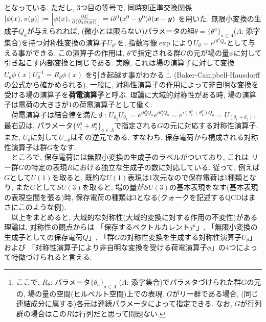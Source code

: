 \documentclass{ltjsarticle}
\theoremstyle{mystyle} %
\numberwithin{equation}{section}
\begin{document}
となっている. ただし, 3つ目の等号で, 同時刻正準交換関係$\left[{\phi(x), \pi(y)}\right]:=\left[{\phi(x), \frac{\partial\mathcal{L}}{\partial(\partial_0 \phi(y))}}\right]=i\delta^{0}(x^0-y^0)\delta(\bm{x}-\bm{y})$
を用いた. 
無限小変換の生成子$Q_a$が与えられれば, (微小とは限らない)パラメータの組$\theta=\{\theta^a\}_{a\in \Lambda}$($\Lambda$: 添字集合)を持つ対称性変換の演算子$U_{\theta^a}$を, 
指数写像$\exp$により$U_{\theta}=e^{i\theta^a Q_a}$として与える事ができる. 
この演算子の作用は, $\theta$で指定される群$G$の元が場の量$\phi$に対して引き起こす内部変換と同じである. 
実際, これは場の演算子に対して変換
$U_{\theta}\phi(x)U^{-1}_{\theta}=R_{\theta}\phi(x)$
を引き起越す事がわかる
\footnote{ここで, $R_{\theta}$: パラメータ$\{\theta_a\}_{a\in \Lambda}$
($\Lambda$: 添字集合)でパラメタづけられた群$G$の元の, 場の量の空間(ヒルベルト空間)上での表現. 
$G$がリー群である場合, (同じ連結成分に属する)各元は連続パラメータによって指定できる. 
なお, $G$が行列群の場合はこの$R$は行列だと思って問題ない. }. 
(Baker-Campbell-Hausdorffの公式から確かめられる), 
一般に, 対称性演算子の作用によって非自明な変換を受ける場の演算子を\textbf{荷電演算子}と呼ぶ. 
理論に大域的対称性がある時, 場の演算子は電荷の大きさが$1$の荷電演算子として働く. \\
　荷電演算子は結合律を満たす: 
$U_{\theta_2}U_{\theta_1}=e^{i\theta^a_2 Q_a}e^{i\theta^b_1 Q_b}=e^{i(\theta^a_1+\theta^a_2) Q_a}
=U_{(\theta_1+\theta_2)}$. 
最右辺は, パラメータ$\{\theta^a_1+\theta^a_2\}_{a\in \Lambda}$で指定される$G$の元に対応する対称性演算子. 
また, $U_{\theta}$に対して$U_{-\theta}$はその逆元である. すなわち, 保存電荷から構成される対称性演算子は群$G$をなす. \\
　ところで, 保存電荷には無限小変換の生成子のラベルがついており, これは
リー群$G$の特定の表現$R$における独立な生成子の数に対応している. 
従って, 例えば$G$として$U(1)$を取ると, 既約な$U(1)$表現は1次元なので保存電荷は1種類となり, 
また$G$として$SU(3)$を取ると, 場の量が$SU(3)$の基本表現をなす(基本表現の表現空間を張る)時, 
保存電荷の種類は3となる(クォークを記述するQCDはまさにこのような例). \\
　以上をまとめると, 大域的な対称性(大域的変換に対する作用の不変性)がある理論は, 
対称性の観点からは
「保存するベクトルカレント$j^\mu$」, 
「無限小変換の生成子としての保存電荷$Q$」, 
「群$G$の対称性変換を生成する対称性演算子$U_{\theta}$」および
「対称性演算子により非自明な変換を受ける荷電演算子$\phi$」の4つによって特徴づけられると言える. 
\end{document}
